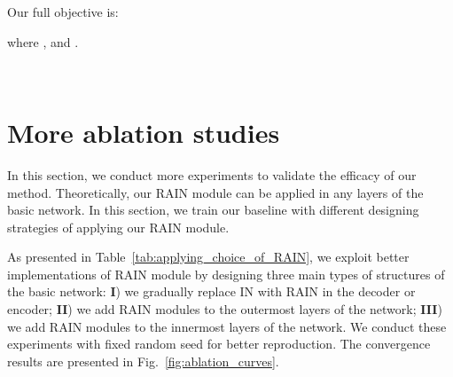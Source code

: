 \documentclass[final]{cvpr}
\begin{document}
Our full objective is: 


where , and . 


\begin{figure*}
\begin{center}
\hspace{0.4cm}
\vspace{0cm}\\\hspace{0.2cm}
\hspace{0.25cm}
\end{center}
\caption{
  Convergence curves on PSNR metric. (a) Type I. We only add RAIN layers to the decoder or encoder. (b) Type II: we add RAIN modules to the outermost layers of the network; (c) Type III: we add RAIN modules to the innermost layers of the network. (d) Convergence curves of DIH~\cite{tsai2017deep} and DIH+RAIN on PSNR metric. Better viewed in color with zoom in.}
\label{fig:ablation_curves}
\end{figure*}

\section{More ablation studies}
\label{sec:more_ablation}
In this section, we conduct more experiments to validate the efficacy of our method. Theoretically, our RAIN module can be applied in any layers of the basic network. In this section, we train our baseline with different designing strategies of applying our RAIN module. 

As presented in Table~\ref{tab:applying_choice_of_RAIN}, we exploit better implementations of RAIN module by designing three main types of structures of the basic network: 
\textbf{I}) we gradually replace IN with RAIN in the decoder or encoder; \textbf{II}) we add RAIN modules to the outermost layers of the network; \textbf{III}) we add RAIN modules to the innermost layers of the network. We conduct these experiments with fixed random seed for better reproduction. The convergence results are presented in Fig.~\ref{fig:ablation_curves}. 
\end{document}
